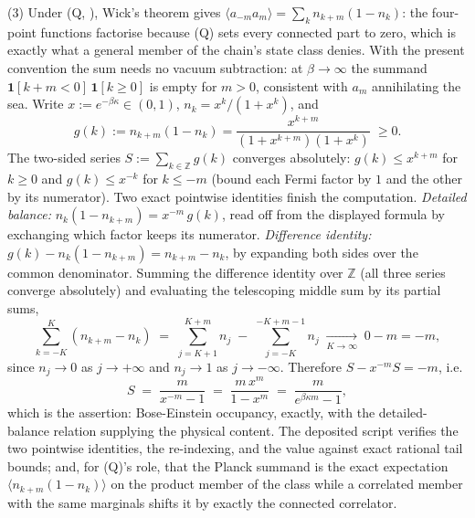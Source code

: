 (3) Under (Q, ), Wick's theorem gives $\langle a_{-m} a_m\rangle = \sum_{k} n_{k+m}(1 - n_k)$: the four-point functions factorise because (Q) sets every connected part to zero, which is exactly what a general member of the chain's state class denies. With the present convention the sum needs no vacuum subtraction: at $\beta \to \infty$ the summand $\mathbf{1}[k + m < 0]\,\mathbf{1}[k \geq 0]$ is empty for $m > 0$, consistent with $a_m$ annihilating the sea. Write $x := e^{-\beta\kappa} \in (0,1)$, $n_k = x^k/(1 + x^k)$, and
\[
g(k) := n_{k+m}(1 - n_k) = \frac{x^{k+m}}{(1 + x^{k+m})(1 + x^k)} \;\geq 0.
\]
The two-sided series $S := \sum_{k \in \mathbb{Z}} g(k)$ converges absolutely: $g(k) \leq x^{k+m}$ for $k \geq 0$ and $g(k) \leq x^{-k}$ for $k \leq -m$ (bound each Fermi factor by $1$ and the other by its numerator). Two exact pointwise identities finish the computation. \emph{Detailed balance:} $n_k(1 - n_{k+m}) = x^{-m}\, g(k)$, read off from the displayed formula by exchanging which factor keeps its numerator. \emph{Difference identity:} $g(k) - n_k(1 - n_{k+m}) = n_{k+m} - n_k$, by expanding both sides over the common denominator. Summing the difference identity over $\mathbb{Z}$ (all three series converge absolutely) and evaluating the telescoping middle sum by its partial sums,
\[
\sum_{k=-K}^{K} (n_{k+m} - n_k) \;=\; \sum_{j=K+1}^{K+m} n_j \;-\; \sum_{j=-K}^{-K+m-1} n_j \;\xrightarrow[K \to \infty]{}\; 0 - m = -m ,
\]
since $n_j \to 0$ as $j \to +\infty$ and $n_j \to 1$ as $j \to -\infty$. Therefore $S - x^{-m} S = -m$, i.e.
\[
S \;=\; \frac{m}{x^{-m} - 1} \;=\; \frac{m\,x^m}{1 - x^m} \;=\; \frac{m}{e^{\beta\kappa m} - 1} ,
\]
which is the assertion: Bose-Einstein occupancy, exactly, with the detailed-balance relation supplying the physical content. The deposited script verifies the two pointwise identities, the re-indexing, and the value against exact rational tail bounds; and, for (Q)'s role, that the Planck summand is the exact expectation $\langle n_{k+m}(1 - n_k)\rangle$ on the product member of the class while a correlated member with the same marginals shifts it by exactly the connected correlator.
